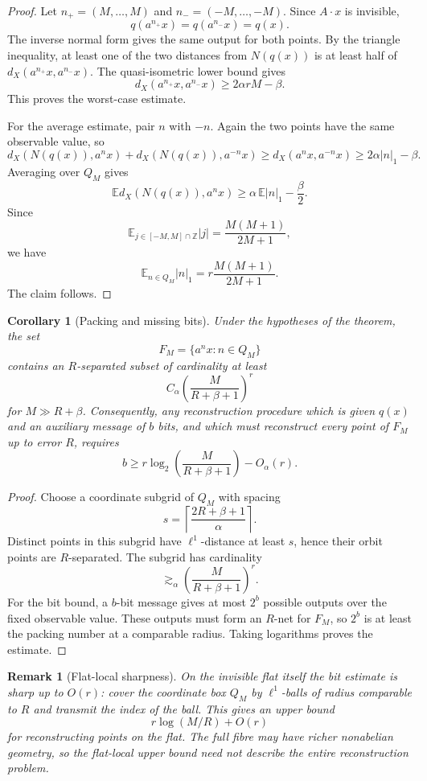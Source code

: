 \documentclass[11pt]{article}
\newtheorem{corollary}[theorem]{Corollary}
\newtheorem{remark}[theorem]{Remark}
\begin{document}
\begin{proof}
Let \(n_+=(M,\ldots,M)\) and \(n_-=(-M,\ldots,-M)\).  Since \(A\cdot x\) is
invisible,
\[
q(a^{n_+}x)=q(a^{n_-}x)=q(x).
\]
The inverse normal form gives the same output for both points.  By the triangle
inequality, at least one of the two distances from \(N(q(x))\) is at least half
of \(d_X(a^{n_+}x,a^{n_-}x)\).  The quasi-isometric lower bound gives
\[
d_X(a^{n_+}x,a^{n_-}x)
\ge
2\alpha rM-\beta .
\]
This proves the worst-case estimate.

For the average estimate, pair \(n\) with \(-n\).  Again the two points have the
same observable value, so
\[
d_X(N(q(x)),a^n x)+d_X(N(q(x)),a^{-n}x)
\ge
d_X(a^n x,a^{-n}x)
\ge
2\alpha |n|_1-\beta .
\]
Averaging over \(Q_M\) gives
\[
\mathbb E d_X(N(q(x)),a^n x)
\ge
\alpha\,\mathbb E |n|_1-\frac{\beta}{2}.
\]
Since
\[
\mathbb E_{j\in[-M,M]\cap\mathbb Z}|j|
=
\frac{M(M+1)}{2M+1},
\]
we have
\[
\mathbb E_{n\in Q_M}|n|_1
=
r\frac{M(M+1)}{2M+1}.
\]
The claim follows.
\end{proof}

\begin{corollary}[Packing and missing bits]
Under the hypotheses of the theorem, the set
\[
F_M=\{a^n x:n\in Q_M\}
\]
contains an \(R\)-separated subset of cardinality at least
\[
C_\alpha
\left(
\frac{M}{R+\beta+1}
\right)^r
\]
for \(M\gg R+\beta\).  Consequently, any reconstruction procedure which is given
\(q(x)\) and an auxiliary message of \(b\) bits, and which must reconstruct every
point of \(F_M\) up to error \(R\), requires
\[
b\ge
r\log_2\!\left(\frac{M}{R+\beta+1}\right)-O_\alpha(r).
\]
\end{corollary}

\begin{proof}
Choose a coordinate subgrid of \(Q_M\) with spacing
\[
s=\left\lceil\frac{2R+\beta+1}{\alpha}\right\rceil .
\]
Distinct points in this subgrid have \(\ell^1\)-distance at least \(s\), hence
their orbit points are \(R\)-separated.  The subgrid has cardinality
\[
\gtrsim_\alpha
\left(
\frac{M}{R+\beta+1}
\right)^r .
\]
For the bit bound, a \(b\)-bit message gives at most \(2^b\) possible outputs over
the fixed observable value.  These outputs must form an \(R\)-net for \(F_M\),
so \(2^b\) is at least the packing number at a comparable radius.  Taking
logarithms proves the estimate.
\end{proof}

\begin{remark}[Flat-local sharpness]
On the invisible flat itself the bit estimate is sharp up to \(O(r)\): cover
the coordinate box \(Q_M\) by \(\ell^1\)-balls of radius comparable to \(R\) and
transmit the index of the ball.  This gives an upper bound
\[
r\log(M/R)+O(r)
\]
for reconstructing points on the flat.  The full fibre may have richer
nonabelian geometry, so the flat-local upper bound need not describe the entire
reconstruction problem.
\end{remark}
\end{document}
